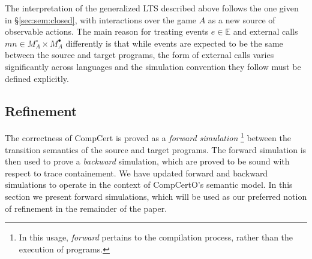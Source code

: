 \documentclass[sigplan,10pt,review,anonymous]{acmart}\settopmatter{printfolios=true,printccs=false,printacmref=false}
\newcommand{\kw}[1]{\ensuremath{ \mathsf{#1} }}
\newcommand{\bind}{\gg\!\!=}
\newcommand{\que}{\circ}
\newcommand{\ans}{\bullet}
\begin{document}
The interpretation of the generalized LTS described above
follows the one given in \S\ref{sec:sem:closed},
with interactions over the game $A$
as a new source of observable actions.
The main reason for treating
events $e \in \mathbb{E}$ and
external calls $m n \in M_A^\que \times M_A^\ans$
differently is that
while events are expected to be the same
between the source and target programs,
the form of external calls varies significantly
across languages
and the simulation convention they follow
must be defined explicitly.




\subsection{Refinement} \label{sec:sem:ref} %

The correctness of CompCert is proved as a
\emph{forward simulation}%
\footnote{In this usage, \emph{forward} pertains to
  the compilation process,
  rather than the execution of programs.}
between the transition semantics of the source and target programs.
The forward simulation is then used to prove a \emph{backward} simulation,
which are proved to be sound with respect to trace containement.
We have updated forward and backward simulations to
operate in the context of CompCertO's semantic model.
In this section we present forward simulations,
which will be used as our preferred notion of refinement
in the remainder of the paper.
\end{document}
